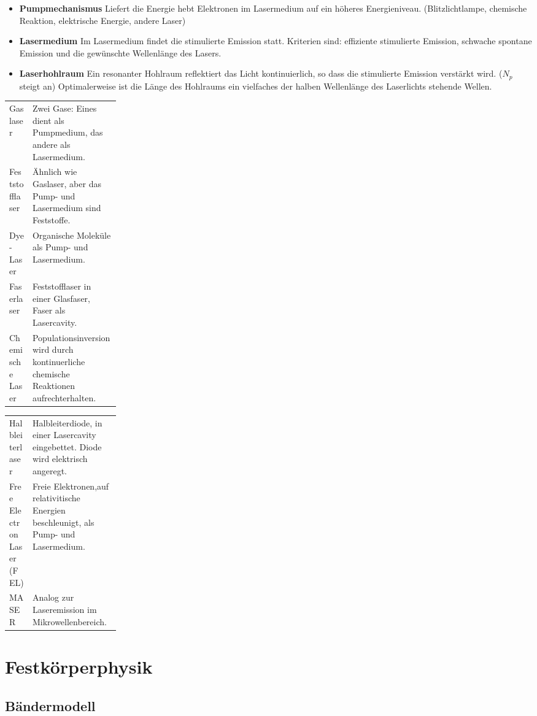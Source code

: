 \documentclass[10pt,a4paper]{scrartcl}
\begin{document}
\begin{multicols*}{3}
	\begin{itemize}
	\compaq
	\item \textbf{Pumpmechanismus}
	Liefert die Energie \dahe hebt Elektronen im Lasermedium auf ein höheres Energieniveau. (Blitzlichtlampe, chemische Reaktion, elektrische Energie, andere Laser)
	\item \textbf{Lasermedium}
	Im Lasermedium findet die stimulierte Emission statt. Kriterien sind: effiziente stimulierte Emission, schwache spontane Emission und die gewünschte Wellenlänge des Lasers.
	\item \textbf{Laserhohlraum}
	Ein resonanter Hohlraum reflektiert das Licht kontinuierlich, so dass die stimulierte Emission verstärkt wird. ($N_p$ steigt an) Optimalerweise ist die Länge des Hohlraums ein vielfaches der halben Wellenlänge des Laserlichts \dahe stehende Wellen.	
	\end{itemize}
	
	\begin{tabulary}{0.93\linewidth}{p{0.21\linewidth}L}
	Gaslaser&Zwei Gase: Eines dient als Pumpmedium, das andere als Lasermedium.\\
	Feststofflaser& Ähnlich wie Gaslaser, aber das Pump- und Lasermedium sind Feststoffe.\\
	Dye-Laser&Organische Moleküle als Pump- und Lasermedium.\\
	Faserlaser&Feststofflaser in einer Glasfaser, Faser als Lasercavity.\\
	Chemische Laser&Populationsinversion wird durch kontinuerliche chemische Reaktionen aufrechterhalten.
	\end{tabulary}
	\begin{tabulary}{0.93\linewidth}{p{0.21\linewidth}L}
	Halbleiterlaser&Halbleiterdiode, in einer Lasercavity eingebettet. Diode wird elektrisch angeregt.\\
	Free Electron Laser (FEL)&Freie Elektronen,auf relativitische Energien beschleunigt, als Pump- und Lasermedium.\\
	MASER&Analog zur Laseremission im Mikrowellenbereich.
	\end{tabulary}
	
	\section{Festkörperphysik}
	
	\subsection{Bändermodell}
	

\end{multicols*}
\end{document}
